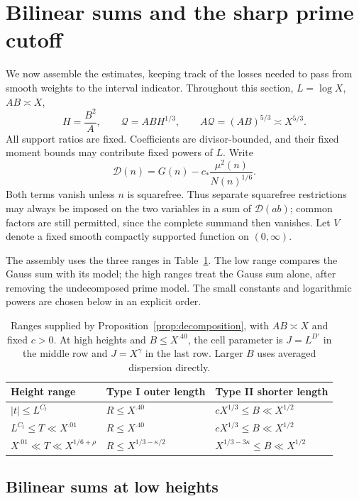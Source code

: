 \section{Bilinear sums and the sharp prime cutoff}
\label{sec:perron}

We now assemble the estimates, keeping track of the losses needed to pass
from smooth weights to the interval indicator. Throughout this section,
\(L=\log X\), \(AB\asymp X\),
\[
 H=\frac{B^2}{A},\qquad \mathcal Q=ABH^{1/3},
 \qquad A\mathcal Q=(AB)^{5/3}\asymp X^{5/3}.
\]
All support ratios are fixed. Coefficients are divisor-bounded, and their
fixed moment bounds may contribute fixed powers of \(L\). Write
\[
 \mathcal D(n)=G(n)-c_*\frac{\mu^2(n)}{N(n)^{1/6}}.
\]
Both terms vanish unless \(n\) is squarefree. Thus separate squarefree
restrictions may always be imposed on the two variables in a sum of
\(\mathcal D(ab)\); common factors are still permitted, since the complete
summand then vanishes. Let \(V\) denote a fixed smooth compactly supported
function on \((0,\infty)\).

The assembly uses the three ranges in Table~\ref{tab:height-ranges}.
The low range compares the Gauss sum with its model; the high ranges
treat the Gauss sum alone, after removing the undecomposed prime model.
The small constants and logarithmic powers are chosen below in an
explicit order.
\begin{table}[ht]
\centering
\small
\begin{tabular}{@{}lll@{}}
\toprule
Height range & Type I outer length & Type II shorter length\\
\midrule
$|t|\le L^{C_t}$ & $R\le X^{.40}$ & $cX^{1/3}\le B\ll X^{1/2}$\\[3pt]
$L^{C_t}\le T\ll X^{.01}$ & $R\le X^{.40}$ & $cX^{1/3}\le B\ll X^{1/2}$\\[3pt]
$X^{.01}\ll T\ll X^{1/6+\rho}$ & $R\le X^{1/3-\kappa/2}$
 & $X^{1/3-3\kappa}\le B\ll X^{1/2}$\\
\bottomrule
\end{tabular}
\caption{Ranges supplied by Proposition~\ref{prop:decomposition}, with
$AB\asymp X$ and fixed $c>0$. At high heights and $B\le X^{.40}$,
the cell parameter is $J=L^{D'}$ in the middle row and $J=X^\gamma$
in the last row. Larger $B$ uses averaged dispersion directly.}
\label{tab:height-ranges}
\end{table}

\subsection{Bilinear sums at low heights}

